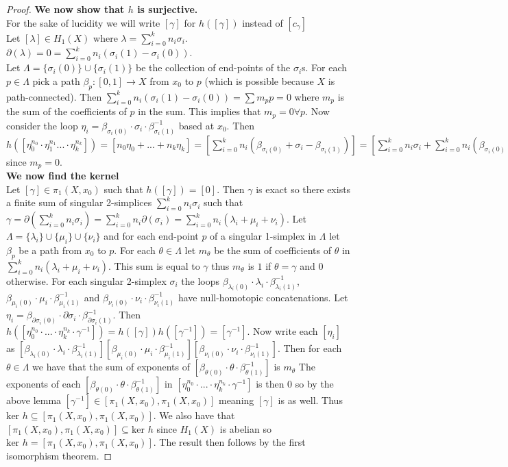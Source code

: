 \documentclass{report}
\begin{document}
\begin{proof}
\noindent \textbf{We now show that $h$ is surjective.}\\
For the sake of lucidity we will write $[\gamma]$ for $h([\gamma])$ instead of $[c_\gamma]$\\
Let $[\lambda]\in H_1(X)$ where $\lambda=\sum_{i=0}^k n_i\sigma_i$.
$\partial (\lambda)=0=\sum_{i=0}^k n_i(\sigma_i(1)-\sigma_i(0))$.\\
Let $\Lambda=\{\sigma_i(0)\}\cup\{\sigma_i(1)\}$ be the collection of end-points of the $\sigma_i$s.
For each $p\in\Lambda$ pick a path $\beta_p\colon [0,1]\to X$ from $x_0$ to $p$ (which is possible because $X$ is path-connected). Then $\sum_{i=0}^k n_i(\sigma_i(1)-\sigma_i(0))=\sum m_pp=0$ where $m_p$ is the sum of the coefficients of $p$ in the sum. This implies that $m_p=0 \forall p$. Now consider the loop $\eta_i=\beta_{\sigma_i(0)}\cdot\sigma_i\cdot\beta_{\sigma_i(1)}^{-1}$ based at $x_0$. Then $h([\eta_0^{n_0}\cdot\eta_1^{n_1}...\cdot\eta_k^{n_k}])=[n_0\eta_0+...+n_k\eta_k]=[\sum_{i=0}^kn_i(\beta_{\sigma_i(0)}+\sigma_i-\beta_{\sigma_i(1)})]=[\sum_{i=0}^kn_i\sigma_i+\sum_{i=0}^kn_i(\beta_{\sigma_i(0)}-\beta_{\sigma_i(1)})]=[\sum_{i=0}^kn_i\sigma_i-\sum m_p\beta_p]=[\sum_{i=0}^kn_i\sigma_i]=[\lambda]$ since $m_p=0$.\\
\noindent\textbf{We now find the kernel}\\
Let $[\gamma]\in\pi_1(X,x_0)$ such that $h([\gamma])=[0]$.
Then $\gamma$ is exact so there exists a finite sum of singular 2-simplices $\sum_{i=0}^kn_i\sigma_i$ such that $\gamma=\partial(\sum_{i=0}^kn_i\sigma_i)=\sum_{i=0}^kn_i\partial(\sigma_i)=\sum_{i=0}^kn_i(\lambda_i+\mu_i+\nu_i)$. Let $\Lambda=\{\lambda_i\}\cup\{\mu_i\}\cup\{\nu_i\}$ and for each end-point $p$ of a singular 1-simplex in $\Lambda$ let $\beta_p$ be a path from $x_0$ to $p$. For each $\theta\in\Lambda$ let $m_\theta$ be the sum of coefficients of $\theta$ in $\sum_{i=0}^kn_i(\lambda_i+\mu_i+\nu_i)$. This sum is equal to $\gamma$ thus $m_\theta$ is $1$ if $\theta=\gamma$ and $0$ otherwise. For each singular 2-simplex $\sigma_i$ the loops $\beta_{\lambda_i(0)}\cdot\lambda_i\cdot\beta_{\lambda_i(1)}^{-1}$, $\beta_{\mu_i(0)}\cdot\mu_i\cdot\beta_{\mu_i(1)}^{-1}$ and $\beta_{\nu_i(0)}\cdot\nu_i\cdot\beta_{\nu_i(1)}^{-1}$ have null-homotopic concatenations. Let $\eta_i=\beta_{\partial\sigma_i(0)}\cdot\partial\sigma_i\cdot\beta_{\partial\sigma_i(1)}^{-1}$. Then $h([\eta_0^{n_0}\cdot...\cdot\eta_k^{n_k}\cdot\gamma^{-1}])=h([\gamma])h([\gamma^{-1}])=[\gamma^{-1}]$. Now write each $[\eta_i]$ as $[\beta_{\lambda_i(0)}\cdot\lambda_i\cdot\beta_{\lambda_i(1)}^{-1}][\beta_{\mu_i(0)}\cdot\mu_i\cdot\beta_{\mu_i(1)}^{-1}][\beta_{\nu_i(0)}\cdot\nu_i\cdot\beta_{\nu_i(1)}^{-1}]$. Then for each $\theta\in\Lambda$ we have that the sum of exponents of $[\beta_{\theta(0)}\cdot\theta\cdot\beta_{\theta(1)}^{-1}]$ is $m_\theta$ The exponents of each $[\beta_{\theta(0)}\cdot\theta\cdot\beta_{\theta(1)}^{-1}]$ in $[\eta_0^{n_0}\cdot...\cdot\eta_k^{n_k}\cdot\gamma^{-1}]$ is then 0 so by the above lemma $[\gamma^{-1}]\in[\pi_1(X,x_0),\pi_1(X,x_0)]$ meaning $[\gamma]$ is as well. Thus $\text{ker }h\subseteq [\pi_1(X,x_0),\pi_1(X,x_0)]$. We also have that $[\pi_1(X,x_0),\pi_1(X,x_0)]\subseteq \text{ker }h$ since $H_1(X)$ is abelian so $\text{ker }h=[\pi_1(X,x_0),\pi_1(X,x_0)]$. The result then follows by the first isomorphism theorem.

\end{proof}
\end{document}
